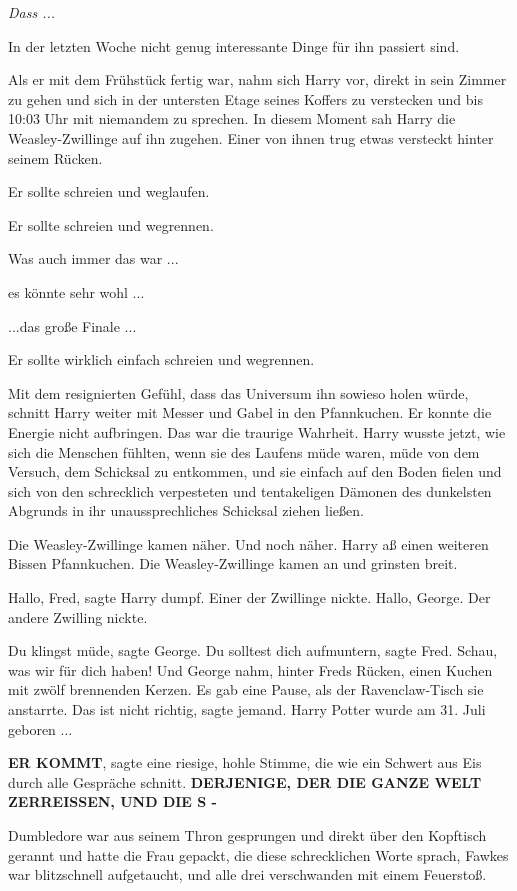 \emph{Dass ...}

In der letzten Woche nicht genug interessante Dinge für ihn passiert sind.

Als er mit dem Frühstück fertig war, nahm sich Harry vor, direkt in sein Zimmer
zu gehen und sich in der untersten Etage seines Koffers zu verstecken und bis
10:03 Uhr mit niemandem zu sprechen. In diesem Moment sah Harry die
Weasley-Zwillinge auf ihn zugehen. Einer von ihnen trug etwas versteckt hinter
seinem Rücken.

Er sollte schreien und weglaufen.

Er sollte schreien und wegrennen.

Was auch immer das war ...

es könnte sehr wohl ...

...das große Finale ...

Er sollte wirklich einfach schreien und wegrennen.

Mit dem resignierten Gefühl, dass das Universum ihn sowieso holen würde, schnitt
Harry weiter mit Messer und Gabel in den Pfannkuchen. Er konnte die Energie
nicht aufbringen. Das war die traurige Wahrheit. Harry wusste jetzt, wie sich
die Menschen fühlten, wenn sie des Laufens müde waren, müde von dem Versuch, dem
Schicksal zu entkommen, und sie einfach auf den Boden fielen und sich von den
schrecklich verpesteten und tentakeligen Dämonen des dunkelsten Abgrunds in ihr
unaussprechliches Schicksal ziehen ließen.

Die Weasley-Zwillinge kamen näher. Und noch näher. Harry aß einen weiteren
Bissen Pfannkuchen. Die Weasley-Zwillinge kamen an und grinsten breit.

\glqq{}Hallo, Fred\grqq{}, sagte Harry dumpf. Einer der Zwillinge nickte. \glqq{}
Hallo, George.\grqq{} Der andere Zwilling nickte.

\glqq{}Du klingst müde\grqq{}, sagte George. \glqq{}Du solltest dich
aufmuntern\grqq{}, sagte Fred. \glqq{}Schau, was wir für dich haben!\grqq{} Und
George nahm, hinter Freds Rücken, einen Kuchen mit zwölf brennenden Kerzen. Es
gab eine Pause, als der Ravenclaw-Tisch sie anstarrte. \glqq{}Das ist nicht
richtig\grqq{}, sagte jemand. \glqq{}Harry Potter wurde am 31. Juli
geboren ...\grqq{}

\textbf{\glqq{}ER KOMMT\grqq{}}, sagte eine riesige, hohle Stimme, die wie ein
Schwert aus Eis durch alle Gespräche schnitt. \textbf{\glqq{}DERJENIGE, DER DIE
GANZE WELT ZERREISSEN, UND DIE S -\grqq{}}

Dumbledore war aus seinem Thron gesprungen und direkt über den Kopftisch gerannt
und hatte die Frau gepackt, die diese schrecklichen Worte sprach, Fawkes war
blitzschnell aufgetaucht, und alle drei verschwanden mit einem Feuerstoß.

